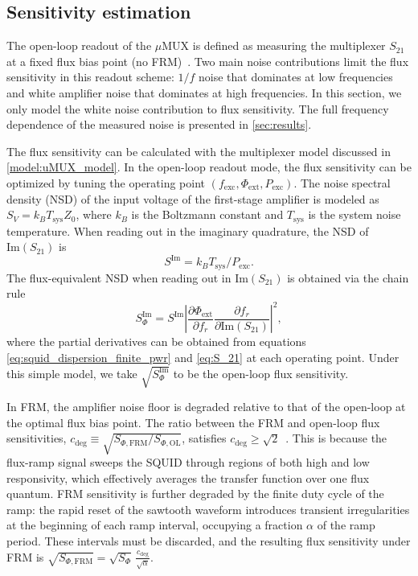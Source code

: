 \documentclass[10pt]{iopart}
\newcommand{\uMUX}{$\mu$MUX\xspace}
\begin{document}
\subsection{Sensitivity estimation} \label{model:sensitivity}

The open-loop readout of the \uMUX is defined as measuring the multiplexer $S_{21}$ at a fixed flux bias point (no FRM)~\cite{schuster_simulation_2023, redondo_optimal_2024}. Two main noise contributions limit the flux sensitivity in this readout scheme: $1/f$ noise that dominates at low frequencies and white amplifier noise that dominates at high frequencies. In this section, we only model the white noise contribution to flux sensitivity. The full frequency dependence of the measured noise is presented in \cref{sec:results}.

The flux sensitivity can be calculated with the multiplexer model discussed in \cref{model:uMUX_model}. In the open-loop readout mode, the flux sensitivity can be optimized by tuning the operating point $(f_{\mathrm{exc}}, \Phi_{\mathrm{ext}}, P_{\mathrm{exc}})$. The noise spectral density (NSD) of the input voltage of the first-stage amplifier is modeled as $S_V = k_B T_{\text{sys}} Z_0$, where $k_B$ is the Boltzmann constant and $T_{\mathrm{sys}}$ is the system noise temperature. When reading out in the imaginary quadrature, the NSD of $\mathrm{Im}(S_{21})$ is
\begin{equation} \label{eq:S_im}
    S^{\mathrm{Im}} = k_B T_{\text{sys}} / P_{\mathrm{exc}}.
\end{equation}
The flux-equivalent NSD when reading out in $\mathrm{Im}(S_{21})$ is obtained via the chain rule
\begin{equation} \label{eq:OL_noise_model}
    S^\text{Im}_\Phi = S^{\text{Im}} \left|\frac{\partial \Phi_{\text{ext}}}{\partial f_r}  \frac{\partial f_r}{\partial \text{Im}(S_{21})} \right|^2,
\end{equation}
where the partial derivatives can be obtained from equations \eqref{eq:squid_dispersion_finite_pwr} and \eqref{eq:S_21} at each operating point. Under this simple model, we take $\sqrt{S^\text{Im}_\Phi}$ to be the open-loop flux sensitivity.

In FRM, the amplifier noise floor is degraded relative to that of the open-loop at the optimal flux bias point. The ratio between the FRM and open-loop flux sensitivities, $c_{\mathrm{deg}}\equiv \sqrt{S_{\Phi,\mathrm{FRM}}/S_{\Phi, \text{OL}}}$, satisfies $c_{\mathrm{deg}} \geq \sqrt{2}$~\cite{mates_flux-ramp_2012}. This is because the flux-ramp signal sweeps the SQUID through regions of both high and low responsivity, which effectively averages the transfer function over one flux quantum. FRM sensitivity is further degraded by the finite duty cycle of the ramp: the rapid reset of the sawtooth waveform introduces transient irregularities at the beginning of each ramp interval, occupying a fraction $\alpha$ of the ramp period. These intervals must be discarded, and the resulting flux sensitivity under FRM is $\sqrt{S_{\Phi,\mathrm{FRM}}} = \sqrt{S_{\Phi}}\,\frac{c_{\mathrm{deg}}}{\sqrt{\alpha}}$.
\end{document}

